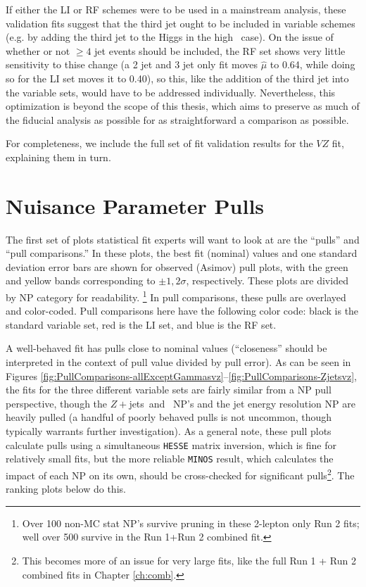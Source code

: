 If either the LI or RF schemes were to be used in a mainstream analysis, these validation fits suggest that the third jet ought to be included in variable schemes (e.g. by adding the third jet to the Higgs in the high \ptv\, case).  On the issue of whether or not $\ge4$ jet events should be included, the RF set shows very little sensitivity to thise change (a 2 jet and 3 jet only fit moves $\hat{\mu}$ to 0.64, while doing so for the LI set moves it to 0.40), so this, like the addition of the third jet into the variable sets, would have to be addressed individually.  Nevertheless, this optimization is beyond the scope of this thesis, which aims to preserve as much of the fiducial analysis as possible for as straightforward a comparison as possible.  

  For completeness, we include the full set of fit validation results for the $VZ$ fit, explaining them in turn.  

\section{Nuisance Parameter Pulls}
The first set of plots statistical fit experts will want to look at are the ``pulls'' and ``pull comparisons.''  In these plots, the best fit (nominal) values and one standard deviation error bars are shown for observed (Asimov) pull plots, with the green and yellow bands corresponding to $\pm1,2\sigma$, respectively.  These plots are divided by NP category for readability.  \footnote{Over 100 non-MC stat NP's survive pruning in these 2-lepton only Run 2 fits; well over 500 survive in the Run 1+Run 2 combined fit.}  In pull comparisons, these pulls are overlayed and color-coded.  Pull comparisons here have the following color code: black is the standard variable set, red is the LI set, and blue is the RF set.  

A well-behaved fit has pulls close to nominal values (``closeness'' should be interpreted in the context of pull value divided by pull error).  As can be seen in Figures \ref{fig:PullComparisons-allExceptGammasvz}--\ref{fig:PullComparisons-Zjetsvz}, the fits for the three different variable sets are fairly similar from a NP pull perspective, though the $Z+$jets \mbb\,and \ptv\, NP's and the jet energy resolution NP are heavily pulled (a handful of poorly behaved pulls is not uncommon, though typically warrants further investigation).  As a general note, these pull plots calculate pulls using a simultaneous \texttt{HESSE} matrix inversion, which is fine for relatively small fits, but the more reliable \texttt{MINOS} result, which calculates the impact of each NP on its own, should be cross-checked for significant pulls\footnote{This becomes more of an issue for very large fits, like the full Run 1 + Run 2 combined fits in Chapter \ref{ch:comb}.}.  The ranking plots below do this.

